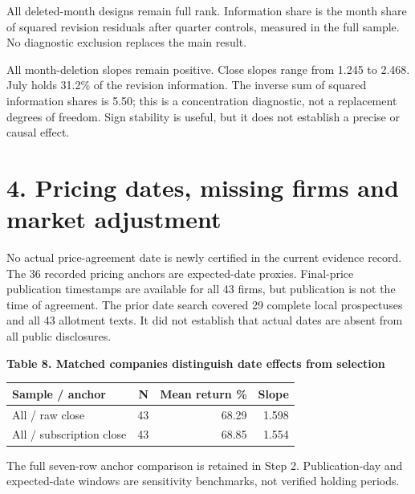 \documentclass[10pt,a4paper]{article}
\begin{document}
{\footnotesize All deleted-month designs remain full rank. Information share is the month share of squared revision residuals after quarter controls, measured in the full sample. No diagnostic exclusion replaces the main result.}\par

All month-deletion slopes remain positive. Close slopes range from 1.245 to 2.468. July holds 31.2\% of the revision information. The inverse sum of squared information shares is 5.50; this is a concentration diagnostic, not a replacement degrees of freedom. Sign stability is useful, but it does not establish a precise or causal effect.

\clearpage

\section*{4. Pricing dates, missing firms and market adjustment}

No actual price-agreement date is newly certified in the current evidence record. The 36 recorded pricing anchors are expected-date proxies. Final-price publication timestamps are available for all 43 firms, but publication is not the time of agreement. The prior date search covered 29 complete local prospectuses and all 43 allotment texts. It did not establish that actual dates are absent from all public disclosures.

\par\addvspace{5pt}\textbf{Table 8. Matched companies distinguish date effects from selection}\par\nobreak\vspace{2pt}

{\small\renewcommand{\arraystretch}{1.10}\begin{tabularx}{\textwidth}{@{}Xrrr@{}}\toprule

\textbf{Sample / anchor} & \textbf{N} & \textbf{Mean return \%} & \textbf{Slope} \\\midrule

All / raw close & 43 & 68.29 & 1.598 \\

All / subscription close & 43 & 68.85 & 1.554 \\

\bottomrule\end{tabularx}}\par

{\footnotesize The full seven-row anchor comparison is retained in Step 2. Publication-day and expected-date windows are sensitivity benchmarks, not verified holding periods.}\par
\end{document}

